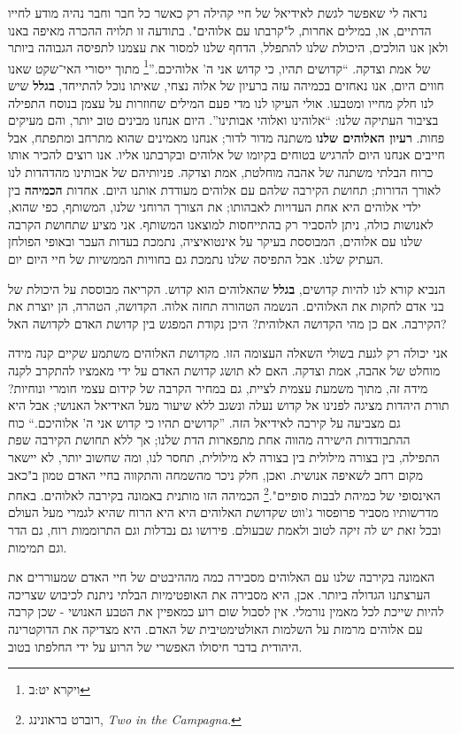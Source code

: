 \documentclass[12pt, extrafontsizes, twopage, a5paper]{memoir}
\begin{document}
  נראה לי שאפשר לגשת לאידיאל של חיי קהילה רק כאשר כל חבר וחבר נהיה מודע לחייו הדתיים, או, במילים אחרות, ל"קרבתו עם אלוהים". בתודעה זו תלויה ההכרה מאיפה באנו
  ולאן אנו הולכים, היכולת שלנו להתפלל, הדחף שלנו למסור את עצמנו לתפיסה הגבוהה ביותר של אמת וצדקה. ``קדושים תהיו, כי קדוש אני ה' אלוהיכם.''\footnote{ויקרא יט:ב} מתוך ייסורי האי־שקט שאנו חווים היום, אנו נאחזים בכמיהה עזה ברעיון של אלוה נצחי, שאיתו נוכל להתייחד, \textbf{בגלל} שיש לנו חלק מחייו ומטבעו. אולי העיקו לנו מדי פעם המילים שחוזרות על עצמן בנוסח התפילה בציבור העתיקה שלנו: ``אלוהינו ואלוהי אבותינו''. היום אנחנו מבינים טוב יותר, והם מעיקים פחות. \textbf{רעיון האלוהים שלנו} משתנה מדור לדור; אנחנו מאמינים שהוא מתרחב ומתפתח, אבל חייבים אנחנו היום להרגיש בטוחים בקיומו של אלוהים ובקרבתנו אליו. אנו רוצים להכיר אותו כרוח הבלתי משתנה של אהבה מוחלטת, אמת וצדקה. פניותיהם של אבותינו מהדהדות לנו לאורך הדורות; תחושת הקירבה שלהם עם אלוהים מעודדת אותנו היום. אחדות \textbf{הכמיהה} בין ילדי אלוהים היא אחת העדויות לאבהותו; את הצורך הרוחני שלנו, המשותף, כפי שהוא, לאנושות כולה, ניתן להסביר רק בהתייחסות למוצאנו המשותף. אני מציע שתחושת הקרבה שלנו עם אלוהים, המבוססת בעיקר על אינטואיציה, נתמכת בעדות העבר ובאופי הפולחן העתיק שלנו. אבל התפיסה שלנו נתמכת גם בחוויות הממשיות של חיי היום יום.

  הנביא קורא לנו להיות קדושים, \textbf{בגלל} שהאלוהים הוא קדוש. הקריאה מבוססת על היכולת של בני אדם לחקות את האלוהים. הנשמה הטהורה תחזה אלוה. הקדושה, הטהרה, הן יוצרת את הקירבה. אם כן מהי הקדושה האלוהית? היכן נקודת המפגש בין קדושת האדם לקדושה האל?

  אני יכולה רק לגעת בשולי השאלה העצומה הזו. מקדושת האלוהים משתמע שקיים קנה מידה מוחלט של אהבה, אמת וצדקה. האם לא תושג קדושת האדם על ידי מאמציו להתקרב לקנה מידה זה, מתוך משמעת עצמית לציית, גם במחיר הקרבה של קידום עצמי חומרי ונוחיות? תורת היהדות מציגה לפנינו אל קדוש נעלה ונשגב ללא שיעור מעל האידיאל האנושי; אבל היא גם מצביעה על קירבה לאידיאל הזה. ''קדושים תהיו כי קדוש אני ה' אלוהיכם.`` כוח ההתבודדות הישירה מהווה אחת מתפארות הדת שלנו; אך ללא תחושת הקירבה שפת התפילה, בין בצורה מילולית בין בצורה לא מילולית, תחסר לנו, ומה שחשוב יותר, לא יישאר מקום רחב לשאיפה אנושית. ואכן, חלק ניכר מהשמחה והתקווה בחיי האדם טמון ב"כאב האינסופי של כמיהת לבבות סופיים".\footnote{%
  רוברט בראונינג, \textenglish{\textsl{Two in the Campagna}}.}
הכמיהה הזו מותנית באמונה בקירבה לאלוהים. באחת מדרשותיו מסביר פרופסור ג'ווט שקדושת האלוהים היא היא הרוח שהיא לגמרי מעל העולם ובכל זאת יש לה זיקה לטוב ולאמת שבעולם. פירושו גם נבדלות וגם התרוממות רוח, גם הדר וגם תמימות.

האמונה בקירבה שלנו עם האלוהים מסבירה כמה מההיבטים של חיי האדם שמעוררים את הערצתנו הגדולה ביותר. אכן, היא מסבירה את האופטימיות הבלתי ניתנת לכיבוש שצריכה להיות שייכת לכל מאמין נורמלי. אין לסבול שום רוע כמאפיין את הטבע האנושי - שכן קרבה עם אלוהים מרמזת על השלמות האולטימטיבית של האדם. היא מצדיקה את הדוקטרינה היהודית בדבר חיסולו האפשרי של הרוע על ידי החלפתו בטוב.
\end{document}

